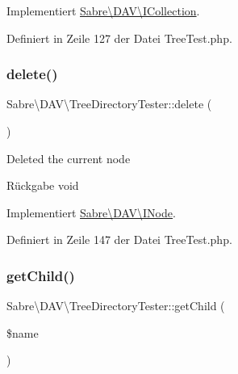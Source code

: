 Implementiert \mbox{\hyperlink{interface_sabre_1_1_d_a_v_1_1_i_collection_a837d88dac548706770368200f83c2ebc}{Sabre\textbackslash{}\+D\+A\+V\textbackslash{}\+I\+Collection}}.



Definiert in Zeile 127 der Datei Tree\+Test.\+php.

\mbox{\label{class_sabre_1_1_d_a_v_1_1_tree_directory_tester_a08e38781016fb278bdb23e7f8efab7cd}} 
\subsubsection{\texorpdfstring{delete()}{delete()}}
{\footnotesize\ttfamily Sabre\textbackslash{}\+D\+A\+V\textbackslash{}\+Tree\+Directory\+Tester\+::delete (\begin{DoxyParamCaption}{ }\end{DoxyParamCaption})}

Deleted the current node

\begin{DoxyReturn}{Rückgabe}
void 
\end{DoxyReturn}


Implementiert \mbox{\hyperlink{interface_sabre_1_1_d_a_v_1_1_i_node_a72cd0ee4e36dfced2b0412d14dbd73e6}{Sabre\textbackslash{}\+D\+A\+V\textbackslash{}\+I\+Node}}.



Definiert in Zeile 147 der Datei Tree\+Test.\+php.

\mbox{\label{class_sabre_1_1_d_a_v_1_1_tree_directory_tester_af843be3a9a6ffd2a67572e8ab4a9c261}} 
\subsubsection{\texorpdfstring{get\+Child()}{getChild()}}
{\footnotesize\ttfamily Sabre\textbackslash{}\+D\+A\+V\textbackslash{}\+Tree\+Directory\+Tester\+::get\+Child (\begin{DoxyParamCaption}\item[{}]{\$name }\end{DoxyParamCaption})}

